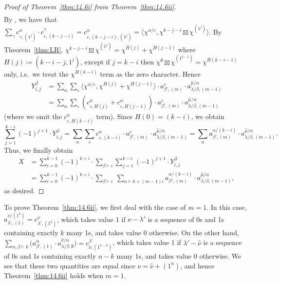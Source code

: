 \begin{proof}[Proof of Theorem~\ref{thm:14.6i} from Theorem~\ref{thm:14.6ii}]
\begin{align*}
	\end{align*}
	By \cite[(2.1)]{SLthesis}, we have that $\sum_\gamma c^\alpha_{\gamma,(1^j)}\cdot c^{\gamma}_{\varepsilon,(k-j-i)} = c^{\alpha}_{\varepsilon,(k-j-i),(1^j)} = \langle \chi^{\alpha/\varepsilon}, \chi^{k-j-i}\boxtimes \chi^{(1^j)}\rangle$. By Theorem~\ref{thm:LR}, $\chi^{k-j-i}\boxtimes \chi^{(1^j)} = \chi^{H(j)}+\chi^{H(j-1)}$ where $H(j)\coloneqq (k-i-j,1^j)$, except if $j=k-i$ then $\chi^\emptyset\boxtimes \chi^{(1^{k-i})}=\chi^{H(k-i-1)}$ only, i.e.~we treat the $\chi^{H(k-i)}$ term as the zero character. Hence
	\begin{align*}
		Y^\beta_{i,j} &= \sum_\alpha \sum_\varepsilon \langle \chi^{\alpha/\varepsilon}, \chi^{H(j)}+\chi^{H(j-1)}\rangle \cdot a^\varepsilon_{\beta',(m)}\cdot a^{\hat{\mu}/\alpha}_{\lambda/\beta,(m-1)}\\
		&= \sum_\alpha \sum_\varepsilon (c^\alpha_{\varepsilon,H(j)} + c^\alpha_{\varepsilon,H(j-1)}) \cdot a^\varepsilon_{\beta',(m)}\cdot a^{\hat{\mu}/\alpha}_{\lambda/\beta,(m-1)}
	\end{align*}
	(where we omit the $c^\alpha_{\varepsilon,H(k-i)}$ term). Since $H(0)=(k-i)$, we obtain
	\[ \sum_{j=1}^{k-i}(-1)^{j+1} \cdot Y^\beta_{i,j} = \sum_\alpha \sum_\varepsilon c^\alpha_{\varepsilon,(k-i)}\cdot a^\varepsilon_{\beta',(m)}\cdot a^{\hat{\mu}/\alpha}_{\lambda/\beta,(m-1)} = \sum_\alpha a^{\alpha/(k-i)}_{\beta',(m)}\cdot a^{\hat{\mu}/\alpha}_{\lambda/\beta,(m-1)}.\]
	Thus, we finally obtain
	\begin{align*} X &= \sum_{i=0}^{k-1}(-1)^{k+i} \cdot \sum_{\beta\vdash i} \sum_{j=1}^{k-i}(-1)^{j+1}\cdot Y^\beta_{i,j} \\&= \sum_{i=0}^{k-1}(-1)^{k+i}\cdot \sum_{\beta\vdash i}\ \sum_{\alpha\vdash k+(m-1)i} a^{\alpha/(k-i)}_{\beta',(m)}\cdot a^{\hat{\mu}/\alpha}_{\lambda/\beta,(m-1)}, \end{align*}
	as desired.
\end{proof}

To prove Theorem~\ref{thm:14.6ii}, we first deal with the case of $m=1$. In this case, $a^{\nu/(1^k)}_{\lambda',(1)} = c^{\nu}_{\lambda',(1^k)}$, which takes value 1 if $\nu-\lambda'$ is a sequence of 0s and 1s containing exactly $k$ many 1s, and takes value 0 otherwise. On the other hand, $\sum_{\alpha,\beta\vdash k} \big(a^\alpha_{\beta',(1)}\cdot a^{\hat{\nu}/\alpha}_{\lambda/\beta,\emptyset}\big)=c^{\lambda'}_{\hat{\nu},(1^{n-k})}$, which takes value 1 if $\lambda'-\hat{\nu}$ is a sequence of 0s and 1s containing exactly $n-k$ many 1s, and takes value 0 otherwise. We see that these two quantities are equal since $\nu=\hat{\nu}+(1^n)$, and hence Theorem~\ref{thm:14.6ii} holds when $m=1$. 

